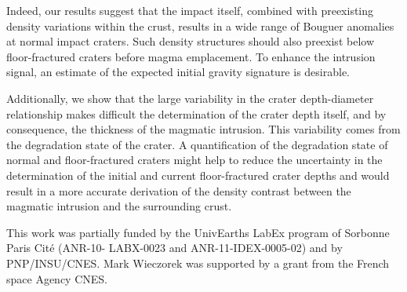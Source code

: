 Indeed,  our results  suggest that  the impact  itself, combined  with
preexisting density  variations within  the crust,  results in  a wide
range of  Bouguer anomalies  at normal  impact craters.   Such density
structures should  also preexist below floor-fractured  craters before
magma emplacement.   To enhance the  intrusion signal, an  estimate of
the expected initial gravity signature is desirable.

Additionally,  we  show  that  the large  variability  in  the  crater
depth-diameter relationship  makes difficult the determination  of the
crater depth itself, and by consequence, the thickness of the magmatic
intrusion.  This variability  comes from the degradation  state of the
crater.   A quantification  of  the degradation  state  of normal  and
floor-fractured craters  might help to  reduce the uncertainty  in the
determination of the initial and current floor-fractured crater depths
and would result in a more accurate derivation of the density contrast
between the magmatic intrusion and the surrounding crust.

\newpage

\begin{acknowledgments}
  This work  was partially funded  by the UnivEarths LabEx  program of
  Sorbonne  Paris Cit\'e  (ANR-10- LABX-0023  and ANR-11-IDEX-0005-02)
  and by PNP/INSU/CNES.  Mark Wieczorek  was supported by a grant from
  the French space Agency CNES.
\end{acknowledgments}
\newpage
% 
% 

